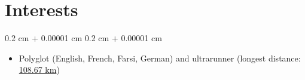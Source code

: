\documentclass[10pt, letterpaper]{article}
\newenvironment{highlights}{
    \begin{itemize}[
        topsep=0.09 cm,
        parsep=0.09 cm,
        partopsep=0pt,
        itemsep=0pt,
        leftmargin=0.4 cm + 10pt
    ]
}{
    \end{itemize}
}
\newenvironment{onecolentry}{
    \begin{adjustwidth}{
        0.2 cm + 0.00001 cm
    }{
        0.2 cm + 0.00001 cm
    }
}{
    \end{adjustwidth}
}
\let\hrefWithoutArrow\href
\renewcommand{\href}[2]{\hrefWithoutArrow{#1}{#2}}
\begin{document}
    \section{Interests}
        \begin{onecolentry}
            \begin{highlights}
                \item Polyglot (English, French, Farsi, German) and ultrarunner (longest distance: \href{https://flow.polar.com/shared/7ea63b8f2e9504d06c913efc08e9c8cd}{108.67 km})
            \end{highlights}
        \end{onecolentry}
\end{document}
